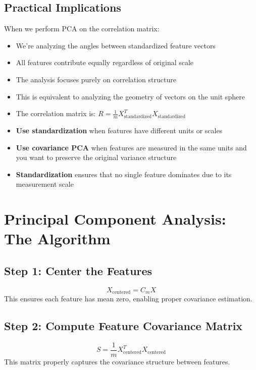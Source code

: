 \begin{notechapter}
\subsection{Practical Implications}

\begin{remark}
When we perform PCA on the correlation matrix:
\begin{itemize}
    \item We're analyzing the angles between standardized feature vectors
    \item All features contribute equally regardless of original scale
    \item The analysis focuses purely on correlation structure
    \item This is equivalent to analyzing the geometry of vectors on the unit sphere
    \item The correlation matrix is: $R = \frac{1}{m}X_{\text{standardized}}^T X_{\text{standardized}}$
\end{itemize}
\end{remark}

\begin{remark}
    \hspace{1.5cm}
\begin{itemize}
    \item \textbf{Use standardization} when features have different units or scales
    \item \textbf{Use covariance PCA} when features are measured in the same units and you want to preserve the original variance structure
    \item \textbf{Standardization} ensures that no single feature dominates due to its measurement scale
\end{itemize}
\end{remark}

\section{Principal Component Analysis: The Algorithm}

\subsection{Step 1: Center the Features}
\[
X_{\text{centered}} = C_m X
\]
This ensures each feature has mean zero, enabling proper covariance estimation.

\subsection{Step 2: Compute Feature Covariance Matrix}
\[
S = \frac{1}{m}X_{\text{centered}}^T X_{\text{centered}}
\]
This matrix properly captures the covariance structure between features.


\end{notechapter}
